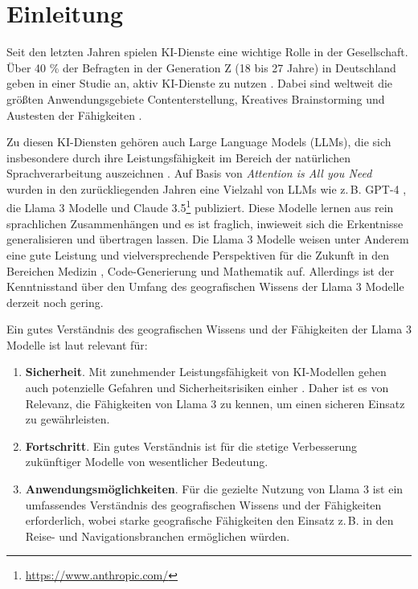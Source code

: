 \chapter{Einleitung}
\label{ch:intro}

Seit den letzten Jahren spielen KI-Dienste eine wichtige Rolle in der Gesellschaft.
Über 40 \% der Befragten in der Generation Z (18 bis 27 Jahre) in Deutschland geben in einer Studie an, aktiv KI-Dienste zu nutzen \citep{horizontUmfrageZurNutzung2023}.
Dabei sind weltweit die größten Anwendungsgebiete Contenterstellung, Kreatives Brainstorming und Austesten der Fähigkeiten \citep{capgeminiGenerativeKIVerwendungszweck2023}.

Zu diesen KI-Diensten gehören auch Large Language Models (LLMs), die sich insbesondere durch ihre Leistungsfähigkeit im Bereich der natürlichen Sprachverarbeitung auszeichnen \citep{zhaoSurveyLargeLanguage2024}.
Auf Basis von \textit{Attention is All you Need} \citep{vaswaniAttentionAllYou2017} wurden in den zurückliegenden Jahren eine Vielzahl von LLMs wie z.\,B. GPT-4 \citep{openaiGPT4TechnicalReport2023}, die Llama 3 Modelle \citep{ai@metaLlama3Herd2024} und Claude 3.5\footnote{\url{https://www.anthropic.com/}} publiziert.
Diese Modelle lernen aus rein sprachlichen Zusammenhängen und es ist fraglich, inwieweit sich die Erkentnisse generalisieren und übertragen lassen.
Die Llama 3 Modelle weisen unter Anderem eine gute Leistung und vielversprechende Perspektiven für die Zukunft in den Bereichen Medizin \citep{liChatDoctorMedicalChat2023}, Code-Generierung \citep{roziereCodeLlamaOpen2024} und Mathematik \citep{azerbayevLlemmaOpenLanguage2024} auf.
Allerdings ist der Kenntnisstand über den Umfang des geografischen Wissens der Llama 3 Modelle derzeit noch gering.

Ein gutes Verständnis des geografischen Wissens und der Fähigkeiten der Llama 3 Modelle ist laut \citet{robertsGPT4GEOHowLanguage2023} relevant für:
\begin{enumerate}
    \item \textbf{Sicherheit}. Mit zunehmender Leistungsfähigkeit von KI-Modellen gehen auch potenzielle Gefahren und Sicherheitsrisiken einher \citep{amodeiConcreteProblemsAI2016}. Daher ist es von Relevanz, die Fähigkeiten von Llama 3 zu kennen, um einen sicheren Einsatz zu gewährleisten.
    \item \textbf{Fortschritt}. Ein gutes Verständnis ist für die stetige Verbesserung zukünftiger Modelle von wesentlicher Bedeutung.
    \item \textbf{Anwendungsmöglichkeiten}. Für die gezielte Nutzung von Llama 3 ist ein umfassendes Verständnis des geografischen Wissens und der Fähigkeiten erforderlich, wobei starke geografische Fähigkeiten den Einsatz z.\,B. in den Reise- und Navigationsbranchen ermöglichen würden.
\end{enumerate}

